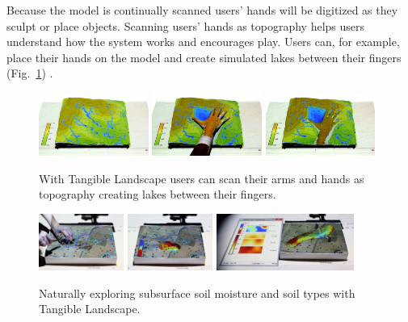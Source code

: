 \documentclass[prodmode,acmtochi]{acmsmall} %
\begin{document}
Because the model is continually scanned
users' hands will be digitized as they sculpt or place objects. 
Scanning users' hands as topography 
helps users understand how the system works
and encourages play. 
Users can, for example, 
place their hands on the model and create simulated lakes between their fingers
(Fig.~\ref{fig:hands}) \cite{ncsu_geoforall_2016b}. 

\begin{figure}
\begin{center}
		\includegraphics[width=0.32\textwidth]{images/hands/tl_hand_1.png}
		\includegraphics[width=0.32\textwidth]{images/hands/tl_hand_2.png}
		\includegraphics[width=0.32\textwidth]{images/hands/tl_hand_3.png}
	\caption{With Tangible Landscape users can scan their arms and hands as topography creating lakes between their fingers.}
	\label{fig:hands}
\end{center}
\end{figure}

\begin{figure}
\begin{center}
		\includegraphics[height=70px]{images/applications/subsurface_1.jpg}
		\includegraphics[height=70px]{images/applications/subsurface_2.jpg}
		\includegraphics[height=70px]{images/applications/subsurface_3.jpg}
	\caption{Naturally exploring subsurface soil moisture and soil types with Tangible Landscape.}
	\label{fig:subsurface}
\end{center}
\end{figure}
\end{document}
